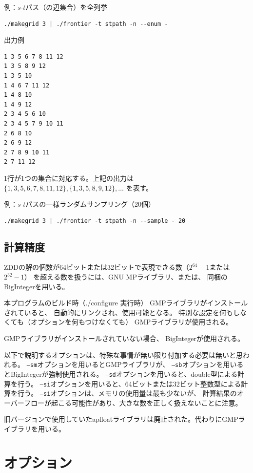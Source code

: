 \documentclass{jsarticle}
\begin{document}
例：$s$-$t$パス（の辺集合）を全列挙

\begin{verbatim}
./makegrid 3 | ./frontier -t stpath -n --enum -
\end{verbatim}

出力例

\begin{verbatim}
1 3 5 6 7 8 11 12
1 3 5 8 9 12
1 3 5 10
1 4 6 7 11 12
1 4 8 10
1 4 9 12
2 3 4 5 6 10
2 3 4 5 7 9 10 11
2 6 8 10
2 6 9 12
2 7 8 9 10 11
2 7 11 12
\end{verbatim}

1行が1つの集合に対応する。上記の出力は $\{1,3,5,6,7,8,11,12\},\{1,3,5,8,9,12\},\ldots$ を表す。

例：$s$-$t$パスの一様ランダムサンプリング（20個）

\begin{verbatim}
./makegrid 3 | ./frontier -t stpath -n --sample - 20
\end{verbatim}

\subsection{計算精度}\label{sec:precision}

ZDDの解の個数が64ビットまたは32ビットで表現できる数（$2^{64} - 1$または$2^{32} - 1$）
を超える数を扱うには、GNU MPライブラリ、または、
同梱のBigIntegerを用いる。

本プログラムのビルド時（./configure 実行時）
GMPライブラリがインストールされていると、
自動的にリンクされ、使用可能となる。
特別な設定を何もしなくても（オプションを何もつけなくても）
GMPライブラリが使用される。

GMPライブラリがインストールされていない場合、
BigIntegerが使用される。

以下で説明するオプションは、特殊な事情が無い限り付加する必要は無いと思われる。
\texttt{--sm}オプションを用いるとGMPライブラリが、
\texttt{--sb}オプションを用いるとBigIntegerが強制使用される。
\texttt{--sd}オプションを用いると、double型による計算を行う。
\texttt{--si}オプションを用いると、64ビットまたは32ビット整数型による計算を行う。
\texttt{--si}オプションは、メモリの使用量は最も少ないが、
計算結果のオーバーフローが起こる可能性があり、大きな数を正しく扱えないことに注意。

旧バージョンで使用していたapfloatライブラリは廃止された。代わりにGMPライブラリを用いる。

\section{オプション}\label{sec:option}
\end{document}
